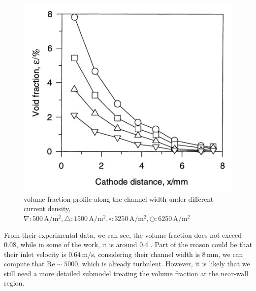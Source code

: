 \begin{figure}[H]
    \centering
    \includegraphics[scale = 0.6]{profile.png}
    \caption{volume fraction profile along the channel width \cite{riegel1998role} under different current density,  $ \nabla: 500\, \mathrm{A/m^2}, \triangle:1500\, \mathrm{A/m^2}, \square: 3250\, \mathrm{A/m^2}, \bigcirc: 6250\, \mathrm{A/m^2}$}
    \label{profile}
\end{figure}

From their experimental data, we can see, the volume fraction does not exceed $0.08$, while in some of the work, it is around $0.4$ \cite{Schillings2015, Dahlkild2001}. Part of the reason could be that their inlet velocity is $0.64 \,  \mathrm{m/s}$, considering their channel width is $8 \, \mathrm{mm}$, we can compute that $\mathrm{Re} \sim 5000$, which is already turbulent. However, it is likely that we still need a more detailed submodel treating the volume fraction at the near-wall region.

